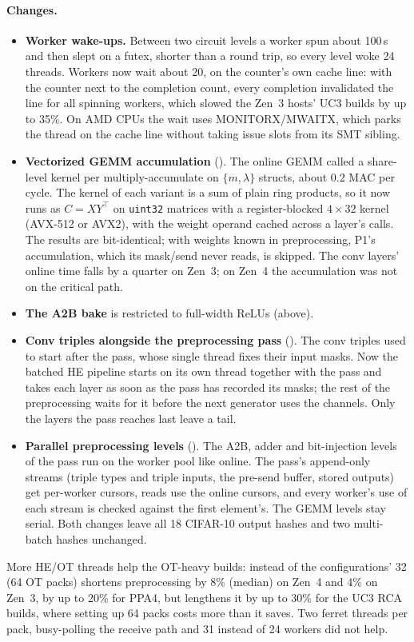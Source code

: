 \paragraph{Changes.}
\begin{itemize}\itemsep1pt
\item \textbf{Worker wake-ups.} Between two circuit levels a worker spun about 100\,\textmu s and then slept on a
  futex, shorter than a round trip, so every level woke 24 threads. Workers now wait about 20\ms, on the counter's own
  cache line: with the counter next to the completion count, every completion invalidated the line for all spinning
  workers, which slowed the Zen~3 hosts' UC3 builds by up to 35\%. On AMD CPUs the wait uses
  MONITORX/MWAITX, which parks the thread on the cache line without taking issue slots from its SMT sibling.
\item \textbf{Vectorized GEMM accumulation} (). The online GEMM called a share-level kernel per
  multiply-accumulate on $\{m, \lambda\}$ structs, about 0.2 MAC per cycle. The kernel of each variant is a sum of plain
  ring products, so it now runs as $C = XY^\top$ on \texttt{uint32} matrices with a register-blocked $4\times 32$
  kernel (AVX-512 or AVX2), with the weight operand cached across a layer's calls. The results are bit-identical; with
  weights known in preprocessing, P1's accumulation, which its mask/send never reads, is skipped. The conv layers'
  online time falls by a quarter on Zen~3; on Zen~4 the accumulation was not on the critical path.
\item \textbf{The A2B bake} is restricted to full-width ReLUs (above).
\item \textbf{Conv triples alongside the preprocessing pass} (). The conv triples used to
  start after the pass, whose single thread fixes their input masks. Now the batched HE pipeline starts on its own thread
  together with the pass and takes each layer as soon as the pass has recorded its masks; the rest of the preprocessing
  waits for it before the next generator uses the channels. Only the layers the pass reaches last leave a tail.
\item \textbf{Parallel preprocessing levels} (). The A2B, adder and bit-injection levels of
  the pass run on the worker pool like online. The pass's append-only streams (triple types and triple inputs, the
  pre-send buffer, stored outputs) get per-worker cursors, reads use the online cursors, and every worker's use of each
  stream is checked against the first element's. The GEMM levels stay serial. Both changes leave all 18 CIFAR-10 output
  hashes and two multi-batch hashes unchanged.
\end{itemize}
More HE/OT threads help the OT-heavy builds:  instead of the configurations' 32 (64 OT packs)
shortens preprocessing by 8\% (median) on Zen~4 and 4\% on Zen~3, by up to 20\% for PPA4, but lengthens it by up to 30\%
for the UC3 RCA builds, where setting up 64 packs costs more than it saves. Two ferret threads per pack,
busy-polling the receive path and 31 instead of 24 workers did not help.

